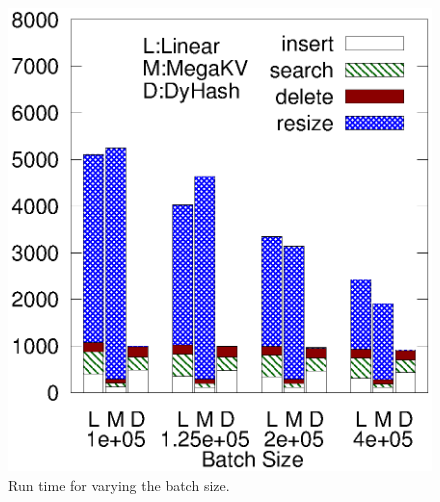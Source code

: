 \begin{figure}[h]
\begin{minipage}{0.18\linewidth}
		\centerline{\dsali}
	\end{minipage}
	\hfill
	\begin{minipage}{0.18\linewidth}\centering
		\includegraphics[width=\linewidth]{pic/dynamic/random/diff_batch_size.eps}
		\centerline{\dsrandom}
	\end{minipage}
	\caption{Run time for varying the batch size.}
	\label{fig:vary-batch-size}
\end{figure}


